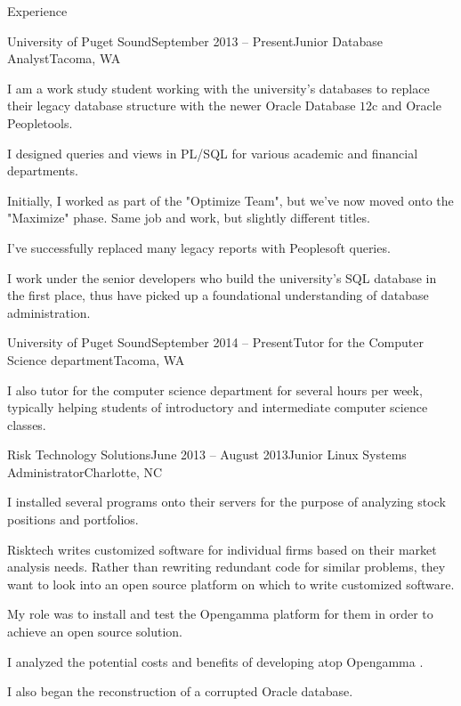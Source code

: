 \documentclass{resume} %
\begin{document}
\begin{rSection}{Experience} 

\begin{rSubsection}{University of Puget Sound}{September 2013 -- Present}{Junior Database Analyst}{Tacoma, WA}

\item I am a work study student working with the university's databases to replace their legacy database structure with the newer Oracle Database $12$c and Oracle Peopletools.
\item I designed queries and views in PL/SQL for various academic and financial departments.
\item Initially, I worked as part of the "Optimize Team", but we've now moved onto the "Maximize" phase. Same job and work, but slightly different titles. 
\item I've successfully replaced many legacy reports with Peoplesoft queries. 
\item I work under the senior developers who build the university's SQL database in the first place, thus have picked up a foundational understanding of database administration.


\end{rSubsection}


\begin{rSubsection}{University of Puget Sound}{September 2014 -- Present}{Tutor for the Computer Science department}{Tacoma, WA}
\item I also tutor for the computer science department for several hours per week, typically helping students of introductory and intermediate computer science classes.
\end{rSubsection}


\begin{rSubsection}{Risk Technology Solutions}{June 2013 -- August 2013}{Junior Linux Systems Administrator}{Charlotte, NC}
\item I installed several programs onto their servers for the purpose of analyzing stock positions and portfolios. 
\item Risktech writes customized software for individual firms based on their market analysis needs. Rather than rewriting redundant code for similar problems, they want to look into an open source platform on which to write customized software. 
\item My role was to install and test the Opengamma platform for them in order to achieve an open source solution. 
\item I analyzed the potential costs and benefits of developing atop Opengamma .
\item I also began the reconstruction of a corrupted Oracle database.
\end{rSubsection}


\end{rSection}
\end{document}
